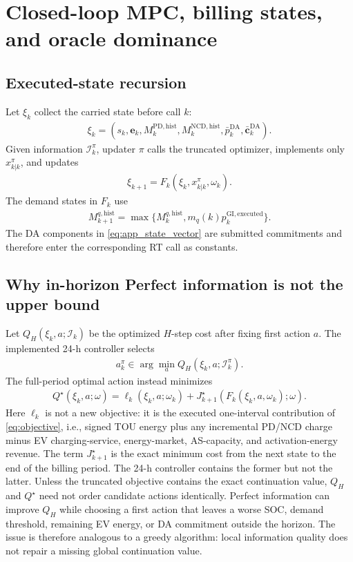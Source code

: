\documentclass[final,5p,times]{elsarticle}
\newcommand{\DA}{\mathrm{DA}}
\newcommand{\GI}{\mathrm{GI}}
\newcommand{\PD}{\mathrm{PD}}
\newcommand{\NCD}{\mathrm{NCD}}
\newcommand{\hist}{\mathrm{hist}}
\begin{document}
\section{Closed-loop MPC, billing states, and oracle dominance}
\label{app:closed_loop}

\subsection{Executed-state recursion}
Let $\xi_k$ collect the carried state before call $k$:
\begin{align}
\xi_k=\left(s_k,\boldsymbol{e}_k,M_k^{\PD,\hist},
M_k^{\NCD,\hist},\bar p_k^{\DA},\bar{\boldsymbol c}_k^{\DA}\right).
\label{eq:app_state_vector}
\end{align}
Given information $\mathcal{I}_k^\pi$, updater $\pi$ calls the truncated optimizer,
implements only $x_{k|k}^\pi$, and updates
\begin{align}
\xi_{k+1}=F_k(\xi_k,x_{k|k}^\pi,\omega_k). \label{eq:app_state_recursion}
\end{align}
The demand states in $F_k$ use
\begin{align}
M_{k+1}^{q,\hist}
=\max\{M_k^{q,\hist},m_q(k)p_k^{\GI,\mathrm{executed}}\}. \label{eq:app_threshold_recursion}
\end{align}
The DA components in \eqref{eq:app_state_vector} are submitted commitments and
therefore enter the corresponding RT call as constants.

\subsection{Why in-horizon Perfect information is not the upper bound}
Let $Q_H(\xi_k,a;\mathcal{I}_k)$ be the optimized $H$-step cost after fixing
first action $a$. The implemented 24-h controller selects
\begin{align}
a_k^\pi\in\arg\min_a Q_H(\xi_k,a;\mathcal{I}_k^\pi). \label{eq:app_truncated_action}
\end{align}
The full-period optimal action instead minimizes
\begin{align}
Q^\star(\xi_k,a;\omega)
=\ell_k(\xi_k,a;\omega_k)+J_{k+1}^\star(F_k(\xi_k,a,\omega_k);\omega).
\label{eq:app_true_q}
\end{align}
Here $\ell_k$ is not a new objective: it is the executed one-interval
contribution of \eqref{eq:objective}, i.e., signed TOU energy plus any
incremental PD/NCD charge minus EV charging-service, energy-market, AS-capacity,
and activation-energy revenue. The term $J_{k+1}^\star$ is the exact minimum
cost from the next state to the end of the billing period. The 24-h controller
contains the former but not the latter.
Unless the truncated objective contains the exact continuation value,
$Q_H$ and $Q^\star$ need not order candidate actions identically. Perfect
information can improve $Q_H$ while choosing a first action that leaves a worse
SOC, demand threshold, remaining EV energy, or DA commitment outside the
horizon. The issue is therefore analogous to a greedy algorithm: local
information quality does not repair a missing global continuation value.
\end{document}
